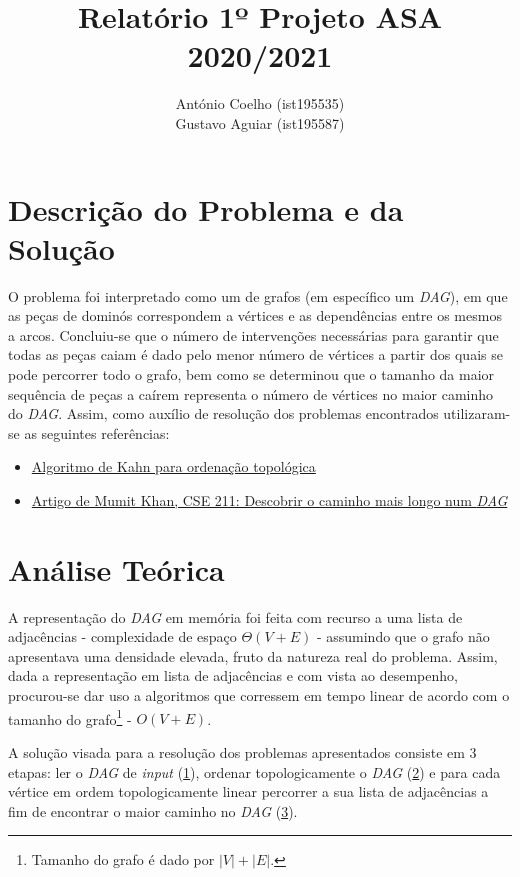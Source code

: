 \documentclass[12pt]{article}
\author{
	António Coelho (ist195535)\\
	Gustavo Aguiar (ist195587)
}
\title{Relatório 1º Projeto ASA 2020/2021}
\date{}
\begin{document}
\maketitle
\section{Descrição do Problema e da Solução}
O problema foi interpretado como um de grafos (em específico um \emph{DAG}), em que as peças de dominós correspondem a vértices e as dependências entre os mesmos a arcos. Concluiu-se que o número de intervenções necessárias para garantir que todas as peças caiam é dado pelo menor número de vértices a partir dos quais se pode percorrer todo o grafo, bem como se determinou que o tamanho da maior sequência de peças a caírem representa o número de vértices no maior caminho do \emph{DAG}.
Assim, como auxílio de resolução dos problemas encontrados utilizaram-se as seguintes referências:
\begin{itemize}
\item\href{https://www.geeksforgeeks.org/topological-sorting-indegree-based-solution/}{Algoritmo de Kahn para ordenação topológica}
\item\href{https://www.mathcs.emory.edu/~cheung/Courses/171/Syllabus/11-Graph/Docs/longest-path-in-dag.pdf}{Artigo de Mumit Khan, CSE 211: Descobrir o caminho mais longo num \emph{DAG}}
\end{itemize}
 
 \section{Análise Teórica}
A representação do \emph{DAG} em memória foi feita com recurso a uma lista de adjacências - complexidade de espaço $\Theta{(V+E)}$ - assumindo que o grafo não apresentava uma densidade elevada, fruto da natureza real do problema. Assim, dada a representação em lista de adjacências e com vista ao desempenho, procurou-se dar uso a algoritmos que corressem em tempo linear de acordo com o tamanho do grafo\footnote{Tamanho do grafo é dado por \href{https://bit.ly/3gfDEJJ}{$\left|V\right|+\left|E\right|$}.} - $O(V+E)$.

A solução visada para a resolução dos problemas apresentados consiste em 3 etapas: ler o \emph{DAG} de \emph{input} (\underline{1}), ordenar topologicamente o \emph{DAG} (\underline{2}) e para cada vértice em ordem topologicamente linear percorrer a sua lista de adjacências a fim de encontrar o maior caminho no \emph{DAG} (\underline{3}).
\end{document}
